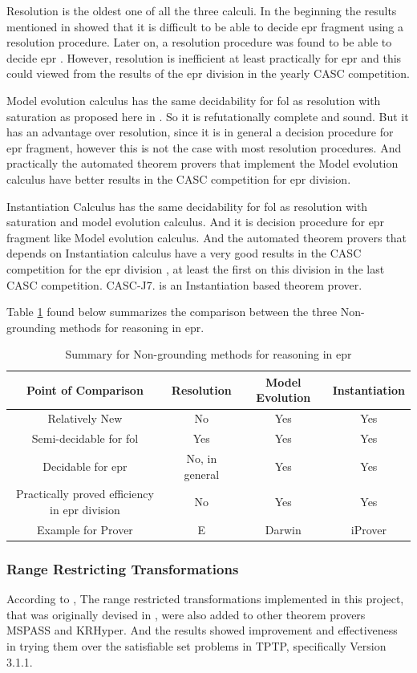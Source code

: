 Resolution is the oldest one of all the three calculi. In the beginning the results mentioned in \cite{RES76} showed that it is difficult to be able to decide \ac{epr} fragment using a resolution procedure. Later on, a resolution procedure was found to be able to decide \ac{epr} \cite{RES93}. However, resolution is inefficient at least practically for \ac{epr} and this could viewed from the results of the \ac{epr} division in the yearly CASC competition.   	   


Model evolution calculus has the same decidability for \ac{fol} as resolution with saturation as proposed here in \cite{BAGA01}. So it is refutationally complete and sound. But it has an advantage over resolution, since it is in general a decision procedure for \ac{epr} fragment, however this is not the case with most resolution procedures. And practically the automated theorem provers that implement the Model evolution calculus have better results in the CASC competition for \ac{epr} division.


Instantiation Calculus has the same decidability for \ac{fol} as resolution with saturation and model evolution calculus. And it is decision procedure for \ac{epr} fragment like Model evolution calculus. And the automated theorem provers that depends on Instantiation calculus have a very good results in the CASC competition for the \ac{epr} division \cite{CASC_24,CASC_J7}, at least the first on this division in the last CASC competition. CASC-J7. is an Instantiation based theorem prover.

 
Table \ref{table:cal_comp} found below summarizes the comparison between the three Non-grounding methods for reasoning in \ac{epr}.

	\begin{table}[H]
		\centering
		\begin{tabular}{||c | c | c | c||} 
 			\hline
			Point of Comparison & Resolution & Model Evolution & Instantiation \\ %
 			\hline\hline
			Relatively New & No & Yes & Yes \\
			Semi-decidable for \ac{fol} & Yes & Yes & Yes \\
			Decidable for \ac{epr} & No, in general & Yes & Yes \\
			Practically proved efficiency in \ac{epr} division & No & Yes & Yes \\ 
			Example for Prover	& E	& Darwin		& iProver \\ [1ex] 
 			\hline
		\end{tabular}
		\caption{Summary for Non-grounding methods for reasoning in \ac{epr}}
		\label{table:cal_comp}
	\end{table}



\subsubsection{Range Restricting Transformations}
According to \cite{BMUG06}, The range restricted transformations implemented in this project, that was originally devised in \cite{BMUG06}, were also added to other theorem provers MSPASS and KRHyper. And the results showed improvement and effectiveness in trying them over the satisfiable set problems in TPTP, specifically Version 3.1.1.   
